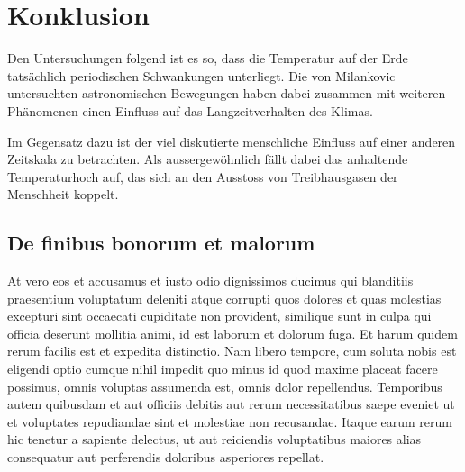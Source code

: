 %
%
%
%
\section{Konklusion
\label{milankovic:section:Konklusion}}

Den Untersuchungen folgend ist es so, dass die Temperatur auf der Erde tatsächlich periodischen Schwankungen unterliegt.
Die von Milankovic untersuchten astronomischen Bewegungen haben dabei zusammen mit weiteren Phänomenen einen Einfluss auf das Langzeitverhalten des Klimas.

Im Gegensatz dazu ist der viel diskutierte menschliche Einfluss auf einer anderen Zeitskala zu betrachten.
Als aussergewöhnlich fällt dabei das anhaltende Temperaturhoch auf, das sich an den Ausstoss von Treibhausgasen der Menschheit koppelt. 



\subsection{De finibus bonorum et malorum
\label{milankovic:subsection:malorum}}
At vero eos et accusamus et iusto odio dignissimos ducimus qui
blanditiis praesentium voluptatum deleniti atque corrupti quos
dolores et quas molestias excepturi sint occaecati cupiditate non
provident, similique sunt in culpa qui officia deserunt mollitia
animi, id est laborum et dolorum fuga. Et harum quidem rerum facilis
est et expedita distinctio. Nam libero tempore, cum soluta nobis
est eligendi optio cumque nihil impedit quo minus id quod maxime
placeat facere possimus, omnis voluptas assumenda est, omnis dolor
repellendus. Temporibus autem quibusdam et aut officiis debitis aut
rerum necessitatibus saepe eveniet ut et voluptates repudiandae
sint et molestiae non recusandae. Itaque earum rerum hic tenetur a
sapiente delectus, ut aut reiciendis voluptatibus maiores alias
consequatur aut perferendis doloribus asperiores repellat.

